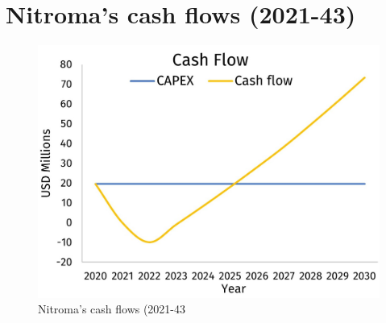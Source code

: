 \section{Nitroma's cash flows (2021-43)}
\label{app:cash-flows-econ}

\begin{figure}[h]
\centering
 \includegraphics{chapters/6-economics/figures/Cash-flow.jpg}
 \caption{Nitroma's cash flows (2021-43 }
 \label{fig:Result of Porter's Five Forces applied to Nitroma}
\end{figure}